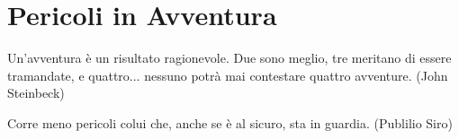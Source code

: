 \section{Pericoli in Avventura}


\begin{changemargin}{0.3cm}{0.3cm}\begin{enfasi}{
Un'avventura è un risultato ragionevole. Due sono meglio, tre meritano di essere tramandate, e quattro... nessuno potrà mai contestare quattro avventure. (John Steinbeck)

\medskip


Corre meno pericoli colui che, anche se è al sicuro, sta in guardia. (Publilio Siro)} \end{enfasi}\end{changemargin}\medskip

\label{pericoli-in-avventura}

